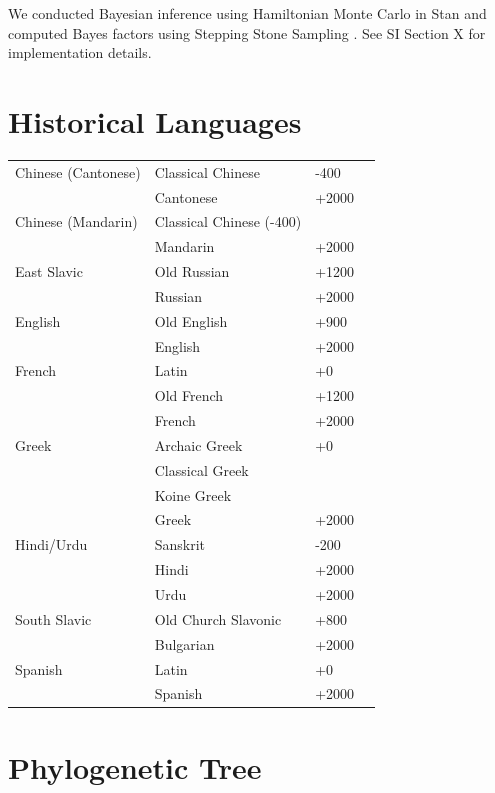 \documentclass[11pt,a4paper]{article}
\begin{document}
We conducted Bayesian inference using Hamiltonian Monte Carlo in Stan \citep{homan2014the,carpenter2017stan} and computed Bayes factors using Stepping Stone Sampling \citep{xie2011improving}.
See SI Section X for implementation details.







\appendix

\section{Historical Languages}



\begin{tabular}{llll} \hline
Chinese (Cantonese) & Classical Chinese & -400  \\
& Cantonese & +2000\\ \hline
Chinese (Mandarin) & Classical Chinese (-400)  \\
& Mandarin & +2000 \\ \hline
East Slavic & Old Russian & +1200 \\
& Russian & +2000 \\ \hline
English & Old English & +900 \\
& English  & +2000\\ \hline
French & Latin &+0  \\
& Old French &+1200\\
& French  & +2000\\ \hline
Greek & Archaic Greek & +0 \\
      & Classical Greek \\
      & Koine Greek \\
& Greek  & +2000\\ \hline
Hindi/Urdu & Sanskrit & -200 \\
& Hindi  & +2000\\
& Urdu  & +2000\\ \hline
South Slavic & Old Church Slavonic & +800 \\
& Bulgarian  & +2000\\ \hline
Spanish & Latin &+0 \\
& Spanish  & +2000\\ \hline
\end{tabular}

\section{Phylogenetic Tree}
\end{document}

